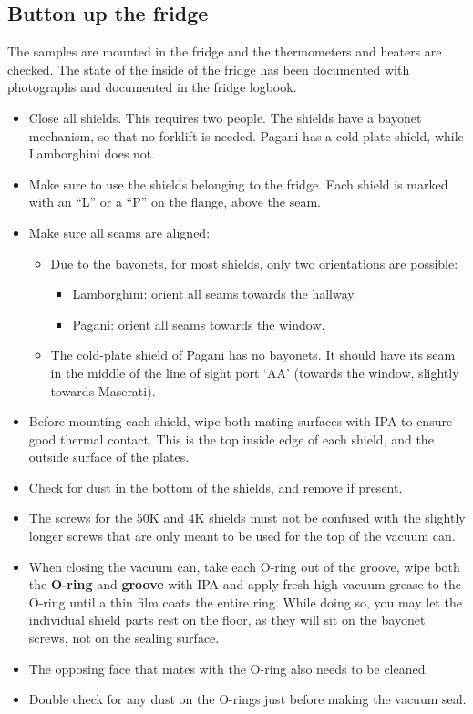 \documentclass{article}[18pt,A4]
\begin{document}
\newpage
\subsection{Button up the fridge}
The samples are mounted in the fridge and the thermometers and heaters are checked.
The state of the inside of the fridge has been documented with photographs and documented in the fridge logbook.
\begin{itemize}
    \item Close all shields. This requires two people. The shields have a bayonet mechanism, so that no forklift is needed.
    Pagani has a cold plate shield, while Lamborghini does not.
    \item Make sure to use the shields belonging to the fridge. Each shield is marked with an ``L'' or a ``P'' on the flange, above the seam.
    \item Make sure all seams are aligned:
        \begin{itemize}
        \item Due to the bayonets, for most shields, only two orientations are possible: 
            \begin{itemize}
            \item Lamborghini: orient all seams towards the hallway. 
            \item Pagani: orient all seams towards the window. 
            \end{itemize}
        \item The cold-plate shield of Pagani has no bayonets. It should have its seam in the middle of the line of sight port `AA' (towards the window, slightly towards Maserati).
        \end{itemize}
    \item Before mounting each shield, wipe both mating surfaces with IPA to ensure good thermal contact. 
    This is the top inside edge of each shield, and the outside surface of the plates.
    \item Check for dust in the bottom of the shields, and remove if present.
    \item The screws for the 50K and 4K shields must not be confused with the slightly longer screws that are only meant to be used for the top of the vacuum can.
    \item When closing the vacuum can, take each O-ring out of the groove, wipe both the \textbf{O-ring} and \textbf{groove} with IPA and apply fresh high-vacuum grease to the O-ring until a thin
    film coats the entire ring.
    While doing so, you may let the individual shield parts rest on the floor, as they will sit on the bayonet screws, not on the sealing surface.
    \item The opposing face that mates with the O-ring also needs to be cleaned.
    \item Double check for any dust on the O-rings just before making the vacuum seal.
\end{itemize}
\end{document}
